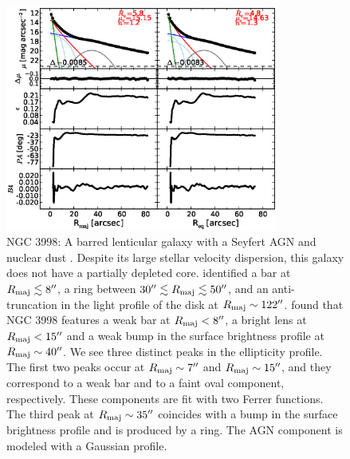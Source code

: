 \documentclass[preprint2]{emulateapj}
\newcommand{\fitfigurewidth}{0.8\textwidth}
\begin{document}
  \begin{figure}[h]
  \begin{center}
  \includegraphics[width=\fitfigurewidth]{n3998_1Dfit.eps}
  \caption{NGC 3998: 
  A barred lenticular galaxy with a Seyfert AGN and nuclear dust \citep{knapp1996n3998}.
  Despite its large stellar velocity dispersion, this galaxy does not have a partially depleted core. 
  \cite{gutierrez2011} identified a bar at $R_{\rm maj} \lesssim 8''$, a ring between $30'' \lesssim R_{\rm maj} \lesssim 50''$, and  
  an anti-truncation in the light profile of the disk at $R_{\rm maj} \sim 122''$.
  \cite{laurikainen2010} found that NGC 3998 features a weak bar at $R_{\rm maj} < 8''$,
  a bright lens at $R_{\rm maj} < 15''$ and a weak bump in the surface brightness profile at $R_{\rm maj} \sim 40''$.
  We see three distinct peaks in the ellipticity profile.
  The first two peaks occur at $R_{\rm maj} \sim 7''$ and $R_{\rm maj} \sim 15''$, and they correspond to a weak bar and to a faint 
  oval component, respectively.
  These components are fit with two Ferrer functions.
  The third peak at $R_{\rm maj} \sim 35''$ coincides with a bump in the surface brightness profile and is produced by a ring.
  The AGN component is modeled with a Gaussian profile.
  }
  \end{center}
  \end{figure}
\end{document}

